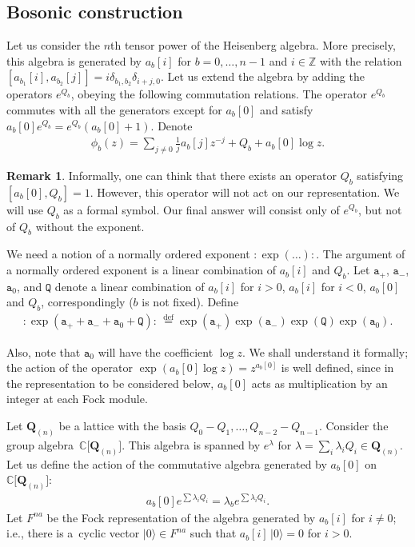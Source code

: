 \documentclass[pdftex]{sigma}
\numberwithin{equation}{section}
\theoremstyle{definition}
\newtheorem{Remark}[Theorem]{Remark}
\newcommand{\vac}{|0 \rangle}
\newcommand{\Q}{\mathbf{Q}_{(n)}}
\begin{document}
\subsection{Bosonic construction} \label{subsection: TW qDboson}

Let us consider the $n$th tensor power of the Heisenberg algebra. More precisely, this algebra is generated by $a_b [i]$ for $b=0, \dots, n-1$ and $i \in \mathbb{Z}$ with the relation $[ a_{b_1}[i], a_{b_2}[j]] = i \delta_{b_1,b_2} \delta_{i+j,0}$. Let us extend the algebra by adding the operators $e^{Q_b}$, obeying the following commutation relations. The operator $e^{Q_b}$ commutes with all the generators except for $a_b[0]$ and satisfy $a_b[0] e^{Q_b} = e^{Q_b} (a_b[0]+1)$. Denote
\begin{gather*}
\phi_{b}(z) = \sum_{j \neq 0} \frac{1}{j} a_{b} [j] z^{-j} + Q_b + a_{b}[0] \log z.
\end{gather*}
\begin{Remark}
Informally, one can think that there exists an operator $Q_b$ satisfying $[a_b[0], Q_b] \allowbreak = 1$. However, this operator will not act on our representation. We will use $Q_b$ as a formal symbol. Our final answer will consist only of $e^{Q_b}$, but not of $Q_b$ without the exponent.
\end{Remark}

We need a notion of a normally ordered exponent $:\!\exp(\dots)\!:$. The argument of a normally ordered exponent is a linear combination of $a_b[i]$ and $Q_b$. Let $\mathtt{a}_+$, $\mathtt{a}_-$, $\mathtt{a}_0$, and $\mathtt{Q}$ denote a linear combination of $a_b[i]$ for $i>0$, $a_b[i]$ for $i<0$, $a_b[0]$ and $Q_b$, correspondingly ($b$ is not fixed). Define
\begin{gather*}
: \! \exp ( \mathtt{a}_+ + \mathtt{a}_- + \mathtt{a}_0 + \mathtt{Q} )\! : \, \stackrel{\text{def}}{=} \exp ( \mathtt{a}_+ ) \exp ( \mathtt{a}_- ) \exp ( \mathtt{Q} ) \exp ( \mathtt{a}_0 ).
\end{gather*}

Also, note that $\mathtt{a}_0$ will have the coefficient $\log z$. We shall understand it formally; the action of the operator $\exp(a_b[0] \log z) = z^{a_b[0]}$ is well defined, since in the representation to be considered below, $a_b[0]$ acts as multiplication by an integer at each Fock module.

Let $\Q$ be a lattice with the basis $Q_0{-}Q_1, \dots, Q_{n-2}{-}Q_{n-1}$. Consider the group algebra~$\mathbb{C} \big[ \Q \big]$. This algebra is spanned by $e^{\lambda}$ for $\lambda= \sum_i \lambda_i Q_i \in \Q$. Let us define the action of the commutative algebra generated by $a_b[0]$ on $\mathbb{C} \big[ \Q \big]$:
\begin{gather*}
a_b[0] e^{\sum \lambda_i Q_i} = \lambda_b e^{\sum \lambda_i Q_i}.
\end{gather*}
Let $F^{na}$ be the Fock representation of the algebra generated by $a_b[i]$ for $i\neq 0$; i.e., there is a~cyclic vector $\vac \in F^{na}$ such that $a_b[i] \, \vac = 0$ for $i>0$.
\end{document}
